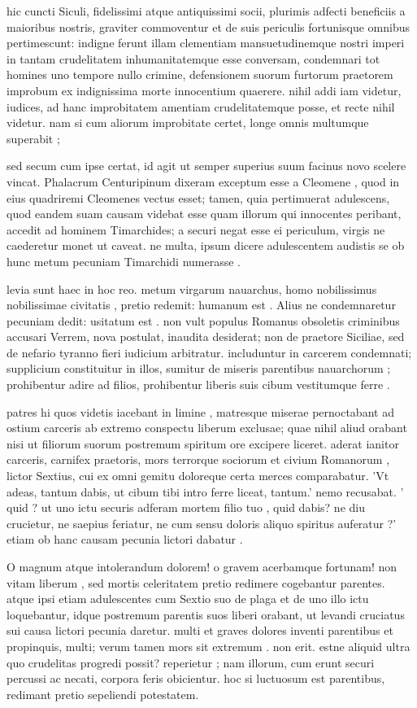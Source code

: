  hic cuncti Siculi, fidelissimi atque antiquissimi socii, plurimis adfecti beneficiis a maioribus nostris, graviter commoventur et de suis periculis fortunisque omnibus pertimescunt: indigne ferunt illam clementiam mansuetudinemque nostri imperi in tantam crudelitatem inhumanitatemque esse conversam, condemnari tot homines uno tempore nullo crimine, defensionem suorum furtorum praetorem improbum ex indignissima morte innocentium quaerere. nihil addi iam videtur, iudices, ad hanc improbitatem amentiam crudelitatemque posse, et recte nihil videtur. nam si cum aliorum improbitate certet, longe omnis multumque superabit ;

 sed secum cum ipse certat, id agit ut semper superius suum facinus novo scelere vincat. Phalacrum Centuripinum dixeram exceptum esse a Cleomene , quod in eius quadriremi Cleomenes vectus esset; tamen, quia pertimuerat adulescens, quod eandem suam causam videbat esse quam illorum qui innocentes peribant, accedit ad hominem Timarchides; a securi negat esse ei periculum, virgis ne caederetur monet ut caveat. ne multa, ipsum dicere adulescentem audistis se ob hunc metum pecuniam Timarchidi numerasse .

 levia sunt haec in hoc reo. metum virgarum nauarchus, homo nobilissimus nobilissimae civitatis , pretio redemit: humanum est . Alius ne condemnaretur pecuniam dedit: usitatum est . non vult populus Romanus obsoletis criminibus accusari Verrem, nova postulat, inaudita desiderat; non de praetore Siciliae, sed de nefario tyranno fieri iudicium arbitratur. includuntur in carcerem condemnati; supplicium constituitur in illos, sumitur de miseris parentibus nauarchorum ; prohibentur adire ad filios, prohibentur liberis suis cibum vestitumque ferre .

 patres hi quos videtis iacebant in limine , matresque miserae pernoctabant ad ostium carceris ab extremo conspectu liberum exclusae; quae nihil aliud orabant nisi ut filiorum suorum postremum spiritum ore excipere liceret. aderat ianitor carceris, carnifex praetoris, mors terrorque sociorum et civium Romanorum , lictor Sextius, cui ex omni gemitu doloreque certa merces comparabatur. 'Vt adeas, tantum dabis, ut cibum tibi intro ferre liceat, tantum.' nemo recusabat. ' quid ? ut uno ictu securis adferam mortem filio tuo , quid dabis? ne diu crucietur, ne saepius feriatur, ne cum sensu doloris aliquo spiritus auferatur ?' etiam ob hanc causam pecunia lictori dabatur .

 O magnum atque intolerandum dolorem! o gravem acerbamque fortunam! non vitam liberum , sed mortis celeritatem pretio redimere cogebantur parentes. atque ipsi etiam adulescentes cum Sextio suo de plaga et de uno illo ictu loquebantur, idque postremum parentis suos liberi orabant, ut levandi cruciatus sui causa lictori pecunia daretur. multi et graves dolores inventi parentibus et propinquis, multi; verum tamen mors sit extremum . non erit. estne aliquid ultra quo crudelitas progredi possit? reperietur ; nam illorum, cum erunt securi percussi ac necati, corpora feris obicientur. hoc si luctuosum est parentibus, redimant pretio sepeliendi potestatem.

